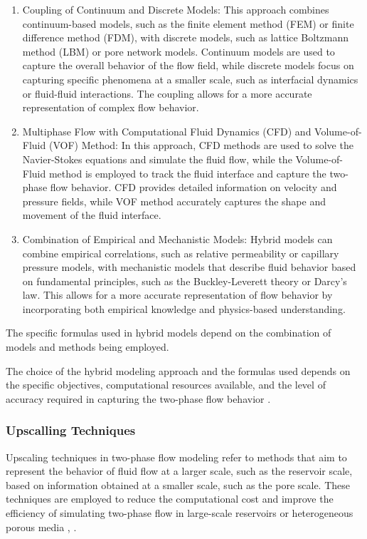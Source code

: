 		\begin{enumerate}
			\item Coupling of Continuum and Discrete Models: This approach combines continuum-based models, such as the finite element method (FEM) or finite difference method (FDM), with discrete models, such as lattice Boltzmann method (LBM) or pore network models. Continuum models are used to capture the overall behavior of the flow field, while discrete models focus on capturing specific phenomena at a smaller scale, such as interfacial dynamics or fluid-fluid interactions. The coupling allows for a more accurate representation of complex flow behavior.
			
			\item Multiphase Flow with Computational Fluid Dynamics (CFD) and Volume-of-Fluid (VOF) Method: In this approach, CFD methods are used to solve the Navier-Stokes equations and simulate the fluid flow, while the Volume-of-Fluid method is employed to track the fluid interface and capture the two-phase flow behavior. CFD provides detailed information on velocity and pressure fields, while VOF method accurately captures the shape and movement of the fluid interface.
			
			\item Combination of Empirical and Mechanistic Models: Hybrid models can combine empirical correlations, such as relative permeability or capillary pressure models, with mechanistic models that describe fluid behavior based on fundamental principles, such as the Buckley-Leverett theory or Darcy's law. This allows for a more accurate representation of flow behavior by incorporating both empirical knowledge and physics-based understanding.
		\end{enumerate}
		
		The specific formulas used in hybrid models depend on the combination of models and methods being employed. 

		The choice of the hybrid modeling approach and the formulas used depends on the specific objectives, computational resources available, and the level of accuracy required in capturing the two-phase flow behavior \cite{tropea2007springer}.

	\subsubsection{Upscalling Techniques}

		Upscaling techniques in two-phase flow modeling refer to methods that aim to represent the behavior of fluid flow at a larger scale, such as the reservoir scale, based on information obtained at a smaller scale, such as the pore scale. These techniques are employed to reduce the computational cost and improve the efficiency of simulating two-phase flow in large-scale reservoirs or heterogeneous porous media \cite{gong2021dynamic}, \cite{valvatne2004predictive}.

